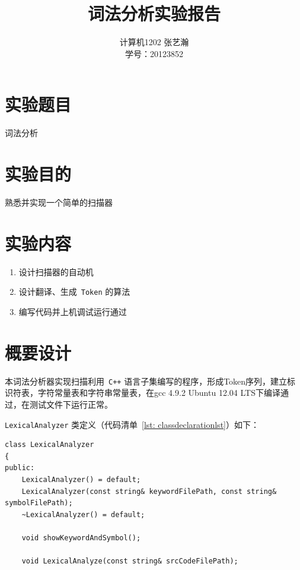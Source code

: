 \documentclass{article}
\begin{document}
\begin{CJK*}{UTF8}{gbsn}
\CJKtilde

\title{词法分析实验报告}

\author{计算机1202 张艺瀚\\学号：20123852}
\maketitle

\section{实验题目}
词法分析

\section{实验目的}
熟悉并实现一个简单的扫描器

\section{实验内容}
\begin{enumerate}
\item 设计扫描器的自动机
\item 设计翻译、生成~\texttt{Token} 的算法
\item 编写代码并上机调试运行通过
\end{enumerate}

\section{概要设计}

本词法分析器实现扫描利用~\texttt{C++} 语言子集编写的程序，形成Token序列，建立标识符表，字符常量表和字符串常量表，在gcc 4.9.2 Ubuntu 12.04 LTS下编译通过，在测试文件下运行正常。

\texttt{LexicalAnalyzer} 类定义（代码清单~\ref{lst: classdeclarationlst}）如下：
\begin{center}
\begin{lstlisting}[caption = {\texttt{LexicalAnalyzer} 类定义代码清单}, label = {lst: classdeclarationlst}]
class LexicalAnalyzer
{
public:
	LexicalAnalyzer() = default;
	LexicalAnalyzer(const string& keywordFilePath, const string& symbolFilePath);
	~LexicalAnalyzer() = default;

	void showKeywordAndSymbol();

	void LexicalAnalyze(const string& srcCodeFilePath);


\end{lstlisting}
\end{center}
\end{CJK*}
\end{document}
